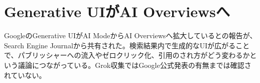 \section{Generative UIがAI Overviewsへ}
GoogleのGenerative UIがAI ModeからAI Overviewsへ拡大しているとの報告が、Search Engine Journalから共有された。検索結果内で生成的なUIが広がることで、パブリッシャーへの流入やゼロクリック化、引用のされ方がどう変わるかという議論につながっている。Grok収集ではGoogle公式発表の有無までは確認されていない。
